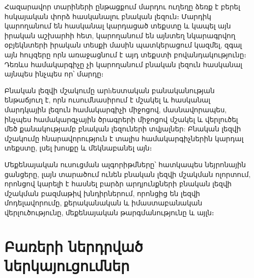 \documentclass[11pt]{article}
\begin{document}
Հազարավոր տարիների ընթացքում մարդու ուղեղը ձեռք է բերել հսկայական փորձ հասկանալու բնական լեզուն։ Մարդիկ կարողանում են հասկանալ կարդացած տեքստը և կապել այն իրական աշխարհի հետ, կարողանում են այնտեղ նկարագրվող օբյեկնտերի իրական տեսքի մասին պատկերացում կազմել, զգալ այն հույզերը որն առաջացնում է այդ տեքստի բովանդակությունը։   Դեռևս համակարգիչը չի կարողանում բնական լեզուն հասկանալ այնպես ինչպես որ՝ մարդը։


Բնական լեզվի մշակումը արhեստական բանականության  ենթաճյուղ է, որն ուսումնասիրում է մշակել և հասկանալ մարդկային լեզուն համակարգիչի միջոցով,  մասնավորապես, ինչպես համակարգչային ծրագրերի միջոցով մշակել և վերլուծել մեծ քանակությամբ բնական լեզուների տվյալներ: Բնական լեզվի մշակումը հնարավորություն է տալիս համակարգիչներին կարդալ տեքստը, լսել խոսքը և մեկնաբանել այն։

Մեքենայական ուսուցման ալգորիթմները՝ հատկապես նեյրոնային ցանցերը,  լայն տարածում ունեն բնական լեզվի մշակման ոլորտում,  որոնցով կարելի է հասնել բարձր արդյունքների բնական լեզվի մշակման բազմաթիվ խնդիրներում, որոնցից են լեզվի մոդելավորումը,  քերականական և իմաստաբանական վերլուծությունը, մեքենայական թարգմանությունը և այլն։  

\section*{\hfill Բառերի ներդրված ներկայուցումներ \hfill} \noindent
{}
{}
\end{document}
